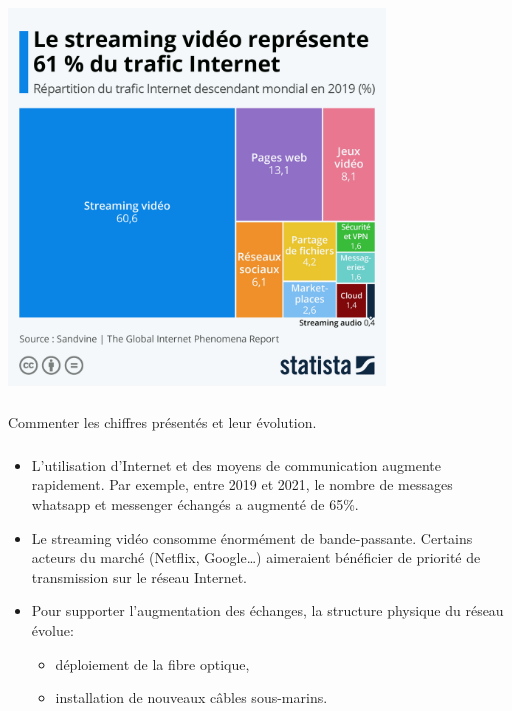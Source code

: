 \documentclass[svgnames,11pt]{beamer}
\begin{document}
\begin{frame}
    \frametitle{}

    \begin{center}
    \centering
    \includegraphics[width=10cm]{ressources/streaming.jpeg}
    
    \end{center}

\end{frame}
\begin{frame}
    \frametitle{}

    \begin{activite}
        Commenter les chiffres présentés et leur évolution.
    \end{activite}

\end{frame}
\begin{frame}
    \frametitle{}

    \begin{itemize}
        \item<1-> L'utilisation d'Internet et des moyens de communication augmente rapidement. Par exemple, entre 2019 et 2021, le nombre de messages whatsapp et messenger échangés a augmenté de 65\%.
        \item<2-> Le streaming vidéo consomme énormément de bande-passante. Certains acteurs du marché (Netflix, Google\dots) aimeraient bénéficier de priorité de transmission sur le réseau Internet.
        \item<3-> Pour supporter l'augmentation des échanges, la structure physique du réseau évolue:
        \begin{itemize}
            \item déploiement de la fibre optique,
            \item installation de nouveaux câbles sous-marins.
        \end{itemize} 
    \end{itemize}

\end{frame}
\end{document}
